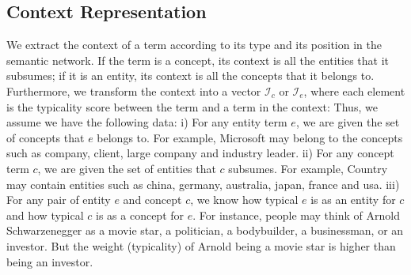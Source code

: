 \subsection{Context Representation}
\label{sec:context}

%
We extract the context of a term according to its type and its position in the
semantic network. If the term is a concept, its context is all the entities that it
subsumes; if it is an entity, its context is all the concepts that it belongs to.
Furthermore, we transform the context into a vector $\mathcal{I}_c$ or $\mathcal{I}_e$, where each element is the typicality score between the term and a term in the context:
Thus, we assume we have the following data: i) For any entity term $e$, we are
given the set of concepts that $e$ belongs to. For example, Microsoft may
belong to the concepts such as company, client, large company and industry leader. ii) For any concept term $c$, we are
given the set of entities that $c$ subsumes. For example, Country may
contain entities such as china, germany, australia, japan, france and usa. iii) For any pair of entity $e$ and concept $c$, we know how typical $e$ is as an entity for $c$ and how typical $c$ is as a concept for $e$. For instance,
people may think of Arnold Schwarzenegger as a movie star, a
politician, a bodybuilder, a businessman, or an investor. But the
weight (typicality) of Arnold being a movie star is higher than being
an investor.

